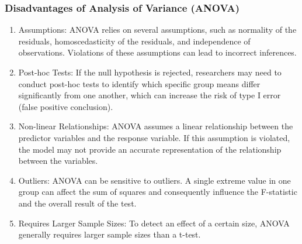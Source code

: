 \documentclass[a4paper]{article}
\begin{document}
	\subsubsection{Disadvantages of Analysis of Variance (ANOVA)}
	\begin{enumerate}
		\item Assumptions: ANOVA relies on several assumptions, such as normality of the residuals, homoscedasticity of the residuals, and independence of observations. Violations of these assumptions can lead to incorrect inferences.
		
		\item Post-hoc Tests: If the null hypothesis is rejected, researchers may need to conduct post-hoc tests to identify which specific group means differ significantly from one another, which can increase the risk of type I error (false positive conclusion).
		
		\item Non-linear Relationships: ANOVA assumes a linear relationship between the predictor variables and the response variable. If this assumption is violated, the model may not provide an accurate representation of the relationship between the variables.
		
		\item Outliers: ANOVA can be sensitive to outliers. A single extreme value in one group can affect the sum of squares and consequently influence the F-statistic and the overall result of the test.
		
		\item Requires Larger Sample Sizes: To detect an effect of a certain size, ANOVA generally requires larger sample sizes than a t-test.
	\end{enumerate}
\end{document}
